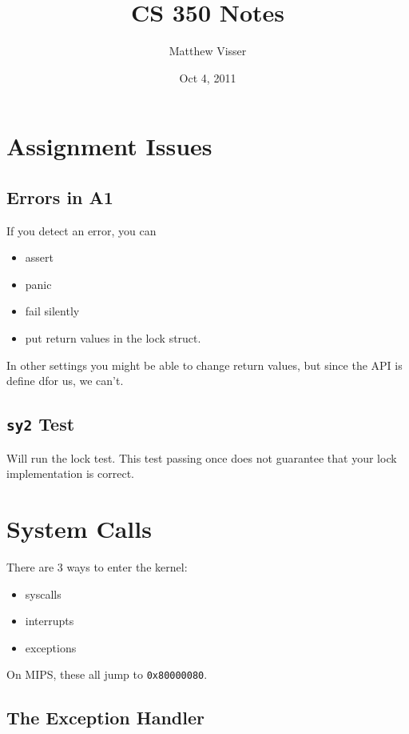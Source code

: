 \documentclass[12pt]{article}
\begin{document}
\title{CS 350 Notes}
\author{Matthew Visser}
\date{Oct  4, 2011}
\maketitle

\section{Assignment Issues}

\subsection{Errors in A1}

If you detect an error, you can
\begin{itemize}
	\item assert
	\item panic
	\item fail silently
	\item put return values in the lock struct.
\end{itemize}

In other settings you might be able to change return values, but since the API
is define dfor us, we can't.

\subsection{\texttt{sy2} Test}

Will run the lock test. This test passing once does not guarantee that your lock
implementation is correct.

\section{System Calls}

There are 3 ways to enter the kernel:
\begin{itemize}
	\item syscalls
	\item interrupts
	\item exceptions
\end{itemize}

On MIPS, these all jump to \texttt{0x80000080}.

\subsection{The Exception Handler}
\end{document}

